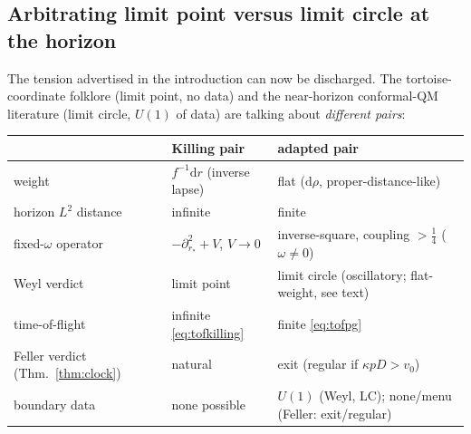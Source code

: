 \documentclass[11pt]{article}
\theoremstyle{definition}
\theoremstyle{remark}
\newcommand{\dd}{\mathrm{d}}
\newcommand{\rstar}{r_{*}}
\begin{document}
\subsection{Arbitrating limit point versus limit circle at the horizon}
\label{subsec:arbitration}

The tension advertised in the introduction can now be discharged. The
tortoise-coordinate folklore (limit point, no data) and the
near-horizon conformal-QM literature (limit circle, $U(1)$ of data)
are talking about \emph{different pairs}:

\begin{center}
\small
\begin{tabular}{@{}lll@{}}
\toprule
 & Killing pair & adapted pair \\
\midrule
weight & $f^{-1}\dd r$ (inverse lapse) & flat ($\dd\rho$,
proper-distance-like) \\
horizon $L^{2}$ distance & infinite & finite \\
fixed-$\omega$ operator & $-\partial_{\rstar}^{2}+V$, $V\to0$ &
inverse-square, coupling $>\tfrac14$ ($\omega\neq0$) \\
Weyl verdict & limit point & limit circle (oscillatory; flat-weight, see text) \\
time-of-flight & infinite \eqref{eq:tofkilling} & finite
\eqref{eq:tofpg} \\
Feller verdict (Thm.~\ref{thm:clock}) & natural & exit
(regular if $\kappa pD>v_{0}$) \\
boundary data & none possible & $U(1)$ (Weyl, LC);
none/menu (Feller: exit/regular) \\
\bottomrule
\end{tabular}
\end{center}
\end{document}
